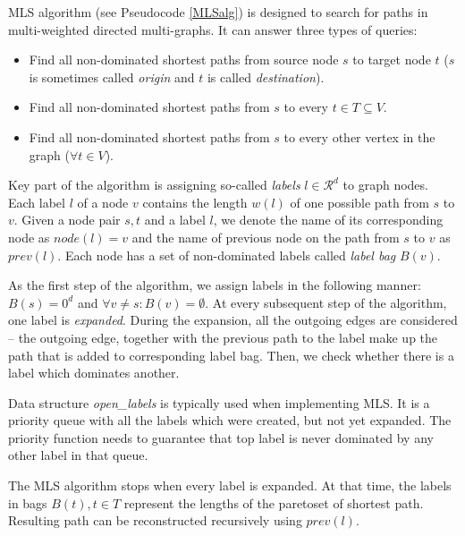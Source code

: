 MLS algorithm (see Pseudocode \ref{MLSalg}) is designed to search for paths in multi-weighted directed multi-graphs. It can answer three types of queries:
\begin{itemize}
\item Find all non-dominated shortest paths from source node $s$ to target node $t$ ($s$ is sometimes called {\em origin} and $t$ is called {\em destination}).
\item Find all non-dominated shortest paths from $s$ to every $t \in T \subseteq V$.
\item Find all non-dominated shortest paths from $s$ to every other vertex in the graph ($\forall t \in V$).
\end{itemize}

Key part of the algorithm is assigning so-called \emph{labels} $l\in \mathcal{R}^d$ to graph nodes.
Each label $l$ of a node $v$ contains the length $w(l)$  of one possible path from $s$ to $v$. Given a node pair $s,t$ and a label $l$, we denote the name of its corresponding node as $node(l) = v$ and the name of previous node on the path from $s$ to $v$ as $prev(l)$.
Each node has a set of non-dominated labels called \emph{label bag} $B(v)$.

As the first step of the algorithm, we assign labels in the following manner: $B(s)=0^d$ and $\forall v \ne s: B(v)=\emptyset$.
At every subsequent step of the algorithm, one label is \emph{expanded}. 
During the expansion, all the outgoing edges are considered -- the outgoing edge, together with the previous path to the label make up the path that is added to corresponding label bag. Then, we check whether there is a label which dominates another.

Data structure {\em open\_labels} is typically used when implementing MLS. It is a priority queue with all the labels which were created, but not yet expanded. The priority function needs to guarantee that top label is never dominated by any other label in that queue.

The MLS algorithm stops when every label is expanded. At that time, the labels in bags $B(t), t \in T$ represent the lengths of the paretoset of shortest path. Resulting path can be reconstructed recursively using $prev(l)$.

